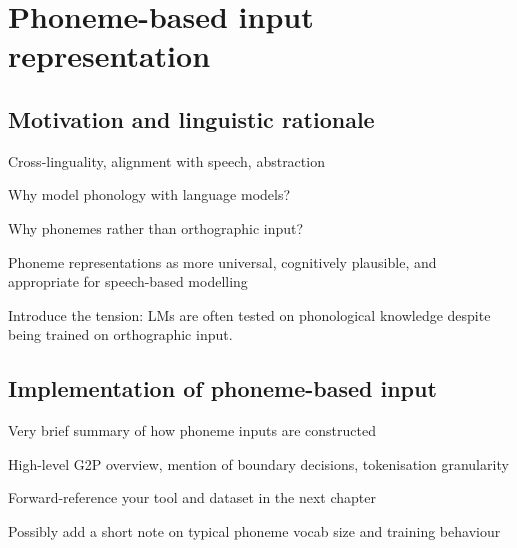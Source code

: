 
\section{Phoneme-based input representation}\label{sec:12-phonemic}

\subsection{Motivation and linguistic rationale}

Cross-linguality, alignment with speech, abstraction

Why model phonology with language models?

Why phonemes rather than orthographic input?

Phoneme representations as more universal, cognitively plausible, and appropriate for speech-based modelling

Introduce the tension: LMs are often tested on phonological knowledge despite being trained on orthographic input.

\subsection{Implementation of phoneme-based input}


Very brief summary of how phoneme inputs are constructed

High-level G2P overview, mention of boundary decisions, tokenisation granularity

Forward-reference your tool and dataset in the next chapter

Possibly add a short note on typical phoneme vocab size and training behaviour


